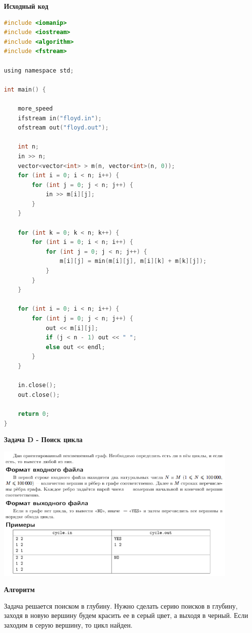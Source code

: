 \documentclass[a4paper,12pt]{article}
\begin{document}
\newpage
\textbf{{\large Исходный код}} \\
\begin{lstlisting}[language=C]
#include <iomanip>
#include <iostream>
#include <algorithm>
#include <fstream>

using namespace std;

int main() {

    more_speed
    ifstream in("floyd.in");
    ofstream out("floyd.out");

    int n;
    in >> n;
    vector<vector<int> > m(n, vector<int>(n, 0));
    for (int i = 0; i < n; i++) {
        for (int j = 0; j < n; j++) {
            in >> m[i][j];
        }
    }

    for (int k = 0; k < n; k++) {
        for (int i = 0; i < n; i++) {
            for (int j = 0; j < n; j++) {
                m[i][j] = min(m[i][j], m[i][k] + m[k][j]);
            }
        }
    }

    for (int i = 0; i < n; i++) {
        for (int j = 0; j < n; j++) {
            out << m[i][j];
            if (j < n - 1) out << " ";
            else out << endl;
        }
    }

    in.close();
    out.close();

    return 0;
}
\end{lstlisting}


\newpage
\textbf{{\large Задача D - Поиск цикла}}

\begin{center}
\includegraphics[width=0.9\textwidth]{SPBGU_GRAPHS/SPBGU_GRAPHS_D.png}\\ [1cm]
\end{center}

\textbf{{\large Алгоритм}}

Задача решается поиском в глубину. Нужно сделать серию поисков в глубину, заходя в новую вершину будем красить ее в серый цвет, а выходя в черный. Если заходим в серую вершину, то цикл найден. \\
\end{document}
